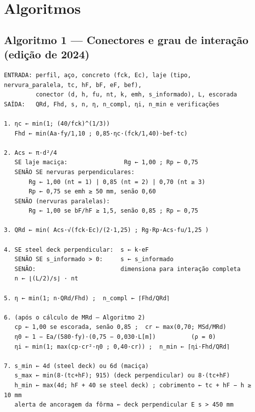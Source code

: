 \section{Algoritmos}\label{sec:3.3}

\subsection{Algoritmo 1 --- Conectores e grau de interação (edição de 2024)}
\begin{lstlisting}[caption={Conectores e grau de interação (edição de 2024)},label={lst:alg-conectores}]
ENTRADA: perfil, aço, concreto (fck, Ec), laje (tipo, nervura_paralela, tc, hF, bF, eF, bef),
         conector (d, h, fu, nt, k, emh, s_informado), L, escorada
SAÍDA:   QRd, Fhd, s, n, η, n_compl, ηi, n_min e verificações

1. ηc ← min(1; (40/fck)^(1/3))
   Fhd ← min(Aa·fy/1,10 ; 0,85·ηc·(fck/1,40)·bef·tc)

2. Acs ← π·d²/4
   SE laje maciça:                Rg ← 1,00 ; Rp ← 0,75
   SENÃO SE nervuras perpendiculares:
       Rg ← 1,00 (nt = 1) | 0,85 (nt = 2) | 0,70 (nt ≥ 3)
       Rp ← 0,75 se emh ≥ 50 mm, senão 0,60
   SENÃO (nervuras paralelas):
       Rg ← 1,00 se bF/hF ≥ 1,5, senão 0,85 ; Rp ← 0,75

3. QRd ← min( Acs·√(fck·Ec)/(2·1,25) ; Rg·Rp·Acs·fu/1,25 )

4. SE steel deck perpendicular:  s ← k·eF
   SENÃO SE s_informado > 0:     s ← s_informado
   SENÃO:                        dimensiona para interação completa
   n ← ⌊(L/2)/s⌋ · nt

5. η ← min(1; n·QRd/Fhd) ;  n_compl ← ⌈Fhd/QRd⌉

6. (após o cálculo de MRd — Algoritmo 2)
   cp ← 1,00 se escorada, senão 0,85 ;  cr ← max(0,70; MSd/MRd)
   η0 ← 1 − Ea/(580·fy)·(0,75 − 0,030·L[m])          (ρ = 0)
   ηi ← min(1; max(cp·cr²·η0 ; 0,40·cr)) ;  n_min ← ⌈ηi·Fhd/QRd⌉

7. s_min ← 4d (steel deck) ou 6d (maciça)
   s_max ← min(8·(tc+hF); 915) (deck perpendicular) ou 8·(tc+hF)
   h_min ← max(4d; hF + 40 se steel deck) ; cobrimento ← tc + hF − h ≥ 10 mm
   alerta de ancoragem da fôrma ← deck perpendicular E s > 450 mm
\end{lstlisting}

